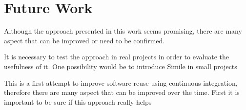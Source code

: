 \chapter{Future Work}
Although the approach presented in this work seems promising, there are many aspect that can be improved or need to be confirmed.

It is necessary to test the approach in real projects in order to evaluate the usefulness of it. One possibility would be to introduce Simile in small projects 

This is a first attempt to improve software reuse using continuous integration, therefore there are many aspect that can be improved over the time. First it is important to be sure if this approach really helps 